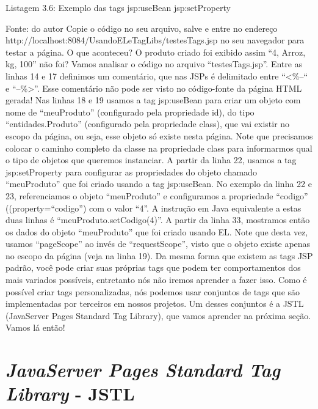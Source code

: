 Listagem 3.6: Exemplo das tags jsp:useBean jsp:setProperty
 
Fonte: do autor
Copie o código no seu arquivo, salve e entre no endereço http://localhost:8084/UsandoELeTagLibs/testesTags.jsp no seu navegador para testar a página. O que aconteceu? O produto criado foi exibido assim “4, Arroz, kg, 100” não foi? Vamos analisar o código no arquivo “testesTags.jsp”. Entre as linhas 14 e 17 definimos um comentário, que nas JSPs é delimitado entre “<\%--“ e “--\%>”. Esse comentário não pode ser visto no código-fonte da página HTML gerada! Nas linhas 18 e 19 usamos a tag jsp:useBean para criar um objeto com nome de “meuProduto” (configurado pela propriedade id), do tipo “entidades.Produto” (configurado pela propriedade class), que vai existir no escopo da página, ou seja, esse objeto só existe nesta página. Note que precisamos colocar o caminho completo da classe na propriedade class para informarmos qual o tipo de objetos que queremos instanciar. A partir da linha 22, usamos a tag jsp:setProperty para configurar as propriedades do objeto chamado “meuProduto” que foi criado usando a tag jsp:useBean. No exemplo da linha 22 e 23, referenciamos o objeto “meuProduto” e configuramos a propriedade “codigo” ((property=“codigo”) com o valor “4”. A instrução em Java equivalente a estas duas linhas é “meuProduto.setCodigo(4)”. A partir da linha 33, mostramos então os dados do objeto “meuProduto” que foi criado usando EL. Note que desta vez, usamos “pageScope” ao invés de “requestScope”, visto que o objeto existe apenas no escopo da página (veja na linha 19).
Da mesma forma que existem as tags JSP padrão, você pode criar suas próprias tags que podem ter comportamentos dos mais variados possíveis, entretanto nós não iremos aprender a fazer isso. Como é possível criar tags personalizadas, nós podemos usar conjuntos de tags que são implementadas por terceiros em nossos projetos. Um desses conjuntos é a JSTL (JavaServer Pages Standard Tag Library), que vamos aprender na próxima seção. Vamos lá então!


\section{\textit{JavaServer Pages Standard Tag Library} - JSTL}


